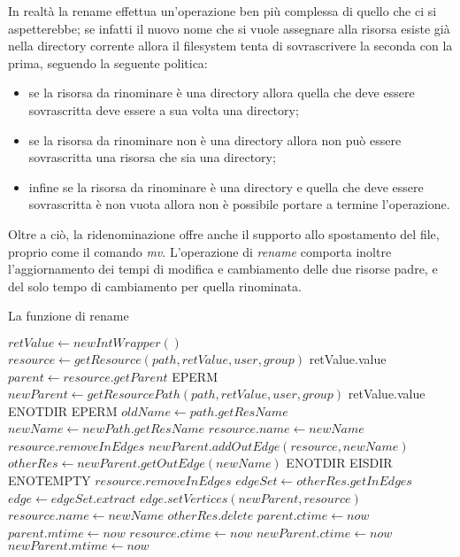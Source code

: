 In realtà la rename effettua un'operazione ben più complessa di quello che ci si aspetterebbe; se infatti il nuovo nome che si vuole assegnare alla risorsa esiste già nella directory corrente allora il filesystem tenta di sovrascrivere la seconda con la prima, seguendo la seguente politica:
\begin {itemize}
\item se la risorsa da rinominare è una directory allora quella che deve essere sovrascritta deve essere a sua volta una directory;
\item se la risorsa da rinominare non è una directory allora non può essere sovrascritta una risorsa che sia una directory;
\item infine se la risorsa da rinominare è una directory e quella che deve essere sovrascritta è non vuota allora non è possibile portare a termine l'operazione.
\end{itemize}
Oltre a ciò, la ridenominazione offre anche il supporto allo spostamento del file, proprio come il comando \emph{mv}. L'operazione di \emph{rename} comporta inoltre l'aggiornamento dei tempi di modifica e cambiamento delle due risorse padre, e del solo tempo di cambiamento per quella rinominata.
\begin{algorithm}
\begin{algorithmic}[5]
\caption{La funzione di rename}
	\State $retValue \gets new IntWrapper()$
	\State $resource \gets getResource(path, retValue, user, group)$
		\State \Return retValue.value
	\EndIf
	\State $parent \gets resource.getParent$
		\State \Return EPERM
	\EndIf
	\State $newParent \gets getResourcePath(path, retValue, user, group)$
		\State \Return retValue.value
	\EndIf
		\State \Return ENOTDIR
	\EndIf
		\State \Return EPERM
	\EndIf
	\State $oldName \gets path.getResName$
	\State $newName \gets newPath.getResName$
		\State $resource.name \gets newName$
		\State $resource.removeInEdges$
		\State $newParent.addOutEdge(resource, newName)$
	\Else
		\State $otherRes \gets newParent.getOutEdge(newName)$
			\State \Return ENOTDIR
		\EndIf
			\State \Return EISDIR
		\EndIf
			\State \Return ENOTEMPTY
		\EndIf
		\State $resource.removeInEdges$
		\State $edgeSet \gets otherRes.getInEdges$
			\State $edge \gets edgeSet.extract$
			\State $edge.setVertices(newParent, resource)$
		\EndWhile
		\State $resource.name \gets newName$
		\State $otherRes.delete$
	\EndIf
	\State $parent.ctime \gets now$
	\State $parent.mtime \gets now$
	\State $resource.ctime \gets now$
	\State $newParent.ctime \gets now$
	\State $newParent.mtime \gets now$
	\State {}
\EndFunction
\end{algorithmic}
\end{algorithm}

